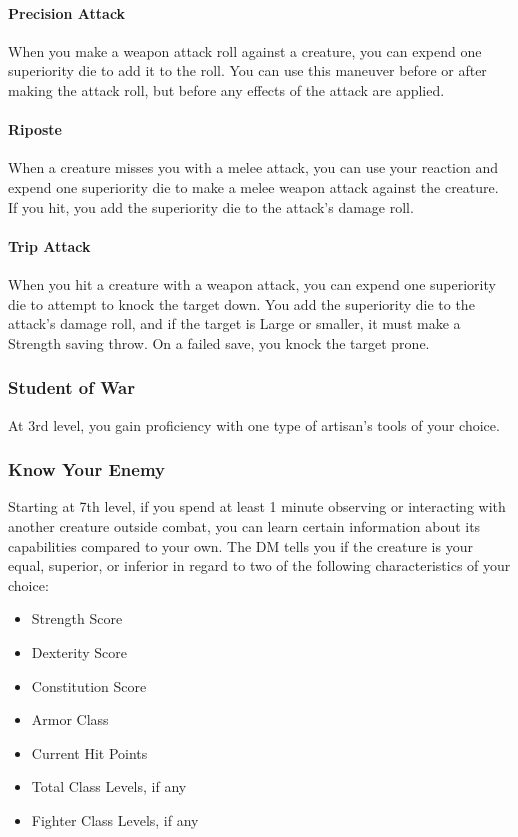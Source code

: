{\paragraph*{Precision Attack}
When you make a weapon attack roll against a creature, you can expend one superiority die to add it to the roll. You can use this maneuver before or after making the attack roll, but before any effects of the attack are applied.
\paragraph*{Riposte}
When a creature misses you with a melee attack, you can use your reaction and expend one superiority die to make a melee weapon attack against the creature. If you hit, you add the superiority die to the attack's damage roll.
\paragraph*{Trip Attack}
When you hit a creature with a weapon attack, you can expend one superiority die to attempt to knock the target down. You add the superiority die to the attack's damage roll, and if the target is Large or smaller, it must make a Strength saving throw. On a failed save, you knock the target prone.
\subsubsection*{Student of War}
At 3rd level, you gain proficiency with one type of artisan's tools of your choice.
\subsubsection*{Know Your Enemy}
Starting at 7th level, if you spend at least 1 minute observing or interacting with another creature outside combat, you can learn certain information about its capabilities compared to your own. The DM tells you if the creature is your equal, superior, or inferior in regard to two of the following characteristics of your choice:
\begin{itemize}
	\item Strength Score
	\item Dexterity Score
	\item Constitution Score
	\item Armor Class
	\item Current Hit Points
	\item Total Class Levels, if any
	\item Fighter Class Levels, if any
\end{itemize}

}

